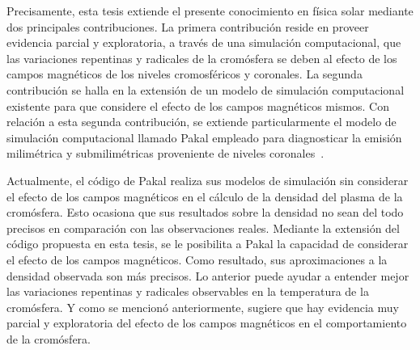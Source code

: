 Precisamente, esta tesis extiende el presente conocimiento en f\'isica solar mediante dos principales contribuciones. La primera contribuci\'on reside en proveer evidencia parcial y exploratoria, a trav\'es de una simulaci\'on computacional,  que las variaciones repentinas y radicales de la crom\'osfera se deben al efecto de los campos magn\'eticos de los niveles cromosf\'ericos y coronales. La segunda contribuci\'on se halla en la extensi\'on de un modelo de simulaci\'on computacional existente para que considere el efecto de los campos magn\'eticos mismos. Con relaci\'on a esta segunda contribuci\'on, se extiende particularmente el modelo de simulaci\'on computacional llamado Pakal empleado para diagnosticar la emisi\'on milim\'etrica y submilim\'etricas proveniente de niveles coronales~\citep{2010ApJS..188..437D}.

Actualmente, el c\'odigo de Pakal realiza sus modelos de simulaci\'on sin considerar el efecto de los campos magn\'eticos en el c\'alculo de la densidad del plasma de la crom\'osfera. Esto ocasiona que sus resultados sobre la densidad no sean del todo precisos en comparaci\'on con las observaciones reales. Mediante la extensi\'on del c\'odigo propuesta en esta tesis, se le posibilita a Pakal la capacidad de considerar el efecto de los campos magn\'eticos. Como resultado, sus aproximaciones a la densidad observada son m\'as precisos. Lo anterior puede ayudar a entender mejor las variaciones repentinas y radicales observables en la temperatura de la crom\'osfera. Y como se mencion\'o anteriormente, sugiere que hay evidencia muy parcial y exploratoria del efecto de los campos magn\'eticos en el comportamiento de la crom\'osfera.
